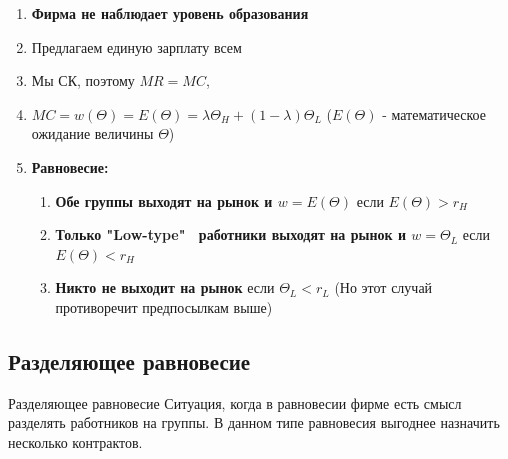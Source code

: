 \begin{enumerate}
    \item \textbf{Фирма не наблюдает уровень образования}
    \item Предлагаем единую зарплату всем
    \item Мы СК, поэтому $MR=MC$,
    \item $MC=w(\Theta)=E(\Theta)=\lambda\Theta_H+(1-\lambda)\Theta_L$ ($E(\Theta)$ - математическое ожидание величины $\Theta$)
    \item \textbf{Равновесие:} \begin{enumerate}
        \item \textbf{Обе группы выходят на рынок и $w=E(\Theta)$} если $E(\Theta)>r_H$
        \item \textbf{Только "Low-type" \ работники выходят на рынок и $w=\Theta_L$} если $E(\Theta)<r_H$
        \item \textbf{Никто не выходит на рынок} если $\Theta_L<r_L$ (Но этот случай противоречит предпосылкам выше)
    \end{enumerate}
\end{enumerate}

\subsection{Разделяющее равновесие}

\begin{mybox}{Разделяющее равновесие}
    Ситуация, когда в равновесии фирме есть смысл разделять работников на группы. В данном типе равновесия
    выгоднее назначить несколько контрактов.
\end{mybox}

